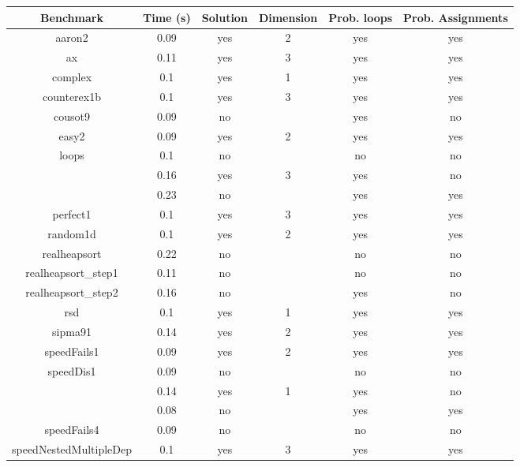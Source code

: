 \begin{center}
\begin{table}[]
  \centering
   \begin{tabular}{c|c|c|c|c|c}
    
{Benchmark} & {Time (s)} & {Solution} & {Dimension} & {Prob. loops} & {Prob. Assignments} \\\hline \hline
{aaron2} & {0.09} & {yes} & {2} & {yes} & {yes} \\\hline
{ax} & {0.11} & {yes} & {3} & {yes} & {yes} \\\hline
{complex} & {0.1} & {yes} & {1} & {yes} & {yes} \\\hline
{counterex1b} & {0.1} & {yes} & {3} & {yes} & {yes} \\\hline
{cousot9} & {0.09} & {no} & {} & {yes} & {no} \\\hline
{easy2} & {0.09} & {yes} & {2} & {yes} & {yes} \\\hline
{loops} & {0.1} & {no} & {} & {no} & {no} \\\hline
{\multirow{2}{*}{nestedloop}} & {0.16} & {yes} & {3} & {yes} & {no} \\\cline{2-6}
{} & {0.23} & {no} & {} & {yes} & {yes} \\\hline
{perfect1} & {0.1} & {yes} & {3} & {yes} & {yes} \\\hline
{random1d} & {0.1} & {yes} & {2} & {yes} & {yes} \\\hline
{realheapsort} & {0.22} & {no} & {} & {no} & {no} \\\hline
{realheapsort\_step1} & {0.11} & {no} & {} & {no} & {no} \\\hline
{realheapsort\_step2} & {0.16} & {no} & {} & {yes} & {no} \\\hline
{rsd} & {0.1} & {yes} & {1} & {yes} & {yes} \\\hline
{sipma91} & {0.14} & {yes} & {2} & {yes} & {yes} \\\hline
{speedFails1} & {0.09} & {yes} & {2} & {yes} & {yes} \\\hline
{speedDis1} & {0.09} & {no} & {} & {no} & {no} \\\hline
{\multirow{2}{*}{speedFails2}} & {0.14} & {yes} & {1} & {yes} & {no} \\\cline{2-6}
{} & {0.08} & {no} & {} & {yes} & {yes} \\\hline
{speedFails4} & {0.09} & {no} & {} & {no} & {no} \\\hline
{speedNestedMultipleDep} & {0.1} & {yes} & {3} & {yes} & {yes} \\\hline

\end{tabular}
\end{table}
\end{center}
